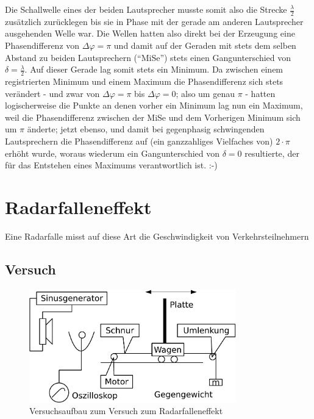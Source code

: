 Die Schallwelle eines der beiden Lautsprecher musste somit also die Strecke \(\frac{\lambda}{2}\) zusätzlich zurücklegen bis sie in Phase mit der gerade am anderen Lautsprecher ausgehenden Welle war.
 Die Wellen hatten also direkt bei der Erzeugung eine Phasendifferenz von \(\Delta \varphi = \pi\) und damit auf der Geraden mit stets dem selben Abstand zu beiden Lautsprechern (``MiSe'') stets einen Gangunterschied von \(\delta = \frac{\lambda}{2}\). 
Auf dieser Gerade lag somit stets ein Minimum. 
 Da zwischen einem registrierten Minimum und einem Maximum die Phasendifferenz sich stets verändert - und zwar von \(\Delta \varphi = \pi\) bis \(\Delta \varphi = 0\); also um genau \(\pi\) - hatten logischerweise die Punkte an denen vorher ein Minimum lag nun ein Maximum, weil die Phasendifferenz zwischen der MiSe und dem Vorherigen Minimum sich um \(\pi\) änderte; jetzt ebenso, und damit bei gegenphasig schwingenden Lautsprechern die Phasendifferenz auf (ein ganzzahliges Vielfaches von) \(2 \cdot \pi\) erhöht wurde, woraus wiederum ein Gangunterschied von \(\delta = 0\) resultierte, der für das Entstehen eines Maximums verantwortlich ist.  :-)
 
 
 
 



			\section{Radarfalleneffekt}

Eine Radarfalle misst auf diese Art die Geschwindigkeit von Verkehrsteilnehmern

		\subsection{Versuch}



\begin{figure}
   \centering
   \includegraphics[width=0.8\textwidth]{praktika/mat_praktika/radar}
   \caption{Versuchsaufbau zum Versuch zum Radarfalleneffekt}
   \label{img_aufbau_radar}
\end{figure}



